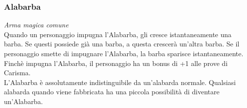 \subsubsection{Alabarba}
\textit{Arma magica comune}\\
Quando un personaggio impugna l'Alabarba, gli cresce istantaneamente una barba. Se questi possiede già una barba, a questa crescerà un'altra barba. Se il personaggio smette di impugnare l'Alabarba, la barba sparisce istantaneamente. Finchè impugna l'Alabarba, il personaggio ha un bonus di +1 alle prove di Carisma.\\
L'Alabarba è assolutamente indistinguibile da un'alabarda normale. Qualsiasi alabarda quando viene fabbricata ha una piccola possibilità di diventare un'Alabarba.